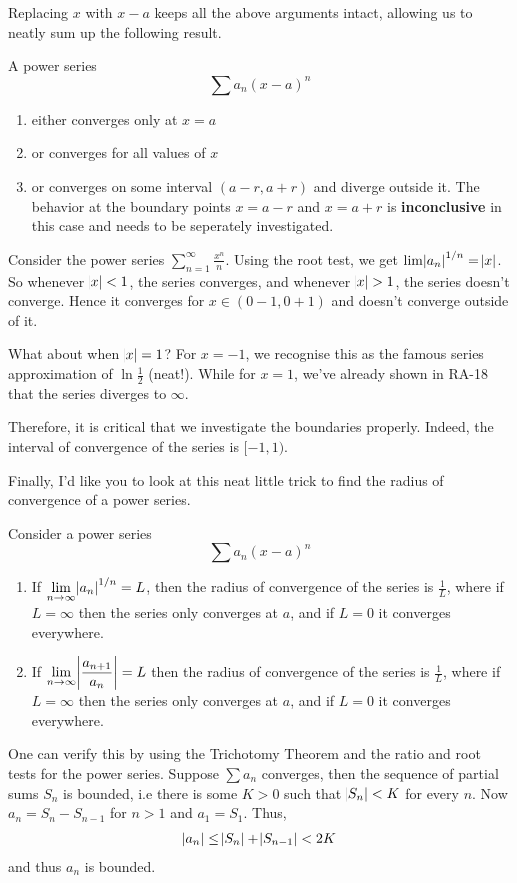 Replacing $x$ with $x - a$ keeps all the above arguments intact, allowing us to neatly sum up the following result.
\begin{SNP}{\crl}A power series
$$
\sum a_n(x - a)^n
$$
\begin{enumerate}
	\item either converges only at $x = a$
	\item or converges for all values of $x$
	\item or converges on some interval $(a - r, a + r)$ and diverge outside it. The behavior at the boundary points $x = a - r$ and $x = a + r$ is \textbf{inconclusive} in this case and needs to be seperately investigated.
\end{enumerate}
\end{SNP}
\begin{SNP}{\xmp}Consider the power series $\sum\limits_{n = 1}^{\infty}\frac{x^n}{n}$. Using the root test, we get $\lim \abs{a_n}^{1/n} = \abs{x}$. So whenever $\abs{x} < 1$, the series converges, and whenever $\abs{x} > 1$, the series doesn't converge. Hence it converges for $x \in (0-1, 0+1)$ and doesn't converge outside of it.

What about when $\abs{x} = 1$? For $x = -1$, we recognise this as the famous series approximation of $\ln \frac 1 2$ (neat!). While for $x = 1$, we've already shown in RA-18 that the series diverges to $\infty$.

Therefore, it is critical that we investigate the boundaries properly. Indeed, the interval of convergence of the series is $[-1, 1)$.
\end{SNP}
Finally, I'd like you to look at this neat little trick to find the radius of convergence of a power series.
\begin{SNP}{\thm}Consider a power series$$\sum a_n(x - a)^n$$\begin{enumerate}
  \item If $\lim\limits_{n\to \infty}\abs{a_n}^{1/n} = L$, then the radius of convergence of the series is $\frac{1}{L}$, where if $L = \infty$ then the series only converges at $a$, and if $L = 0$ it converges everywhere.
  \item If $\lim\limits_{n\to \infty}\abs{\dfrac{a_{n + 1}}{a_n}} = L$ then the radius of convergence of the series is $\frac{1}{L}$, where if $L = \infty$ then the series only converges at $a$, and if $L = 0$ it converges everywhere.
\end{enumerate}
\end{SNP}
One can verify this by using the Trichotomy Theorem and the ratio and root tests for the power series.
\AnswerSection
\ans Suppose $\sum a_n$ converges, then the sequence of partial sums $S_n$ is bounded, i.e there is some $K > 0$ such that $\abs{S_n} < K$ for every $n$. Now $a_n = S_n - S_{n - 1}$ for $n > 1$ and $a_1 = S_1$. Thus,
\begin{align*}
\abs{a_n} \leq \abs{S_n} + \abs{S_{n - 1}} < 2K
\end{align*}
and thus $a_n$ is bounded.
